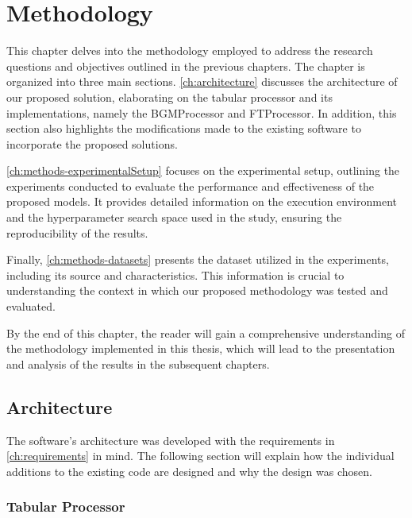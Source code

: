 \chapter{Methodology}
\label{ch:methodology}

This chapter delves into the methodology employed to address the research questions and objectives outlined in the previous chapters.
The chapter is organized into three main sections.
\autoref{ch:architecture} discusses the architecture of our proposed solution, elaborating on the tabular processor and its implementations, namely the BGMProcessor and FTProcessor.
In addition, this section also highlights the modifications made to the existing software to incorporate the proposed solutions.

\autoref{ch:methods-experimentalSetup} focuses on the experimental setup, outlining the experiments conducted to evaluate the performance and effectiveness of the proposed models.
It provides detailed information on the execution environment and the hyperparameter search space used in the study, ensuring the reproducibility of the results.

Finally, \autoref{ch:methods-datasets} presents the dataset utilized in the experiments, including its source and characteristics.
This information is crucial to understanding the context in which our proposed methodology was tested and evaluated.

By the end of this chapter, the reader will gain a comprehensive understanding of the methodology implemented in this thesis, which will lead to the presentation and analysis of the results in the subsequent chapters.

\section{Architecture}
\label{ch:architecture}

The software's architecture was developed with the requirements in \autoref{ch:requirements} in mind.
The following section will explain how the individual additions to the existing code are designed and why the design was chosen.


\subsection{Tabular Processor}
\label{ch:architecture-tabularProcessor}

